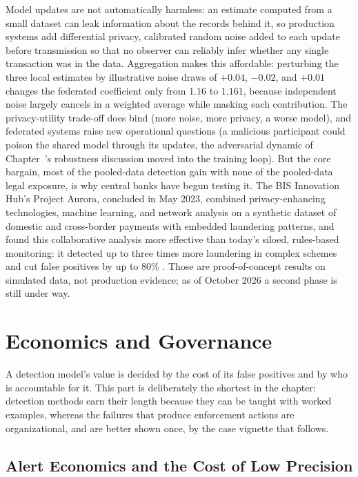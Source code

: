 \documentclass[../ai_in_finance]{subfiles}
\begin{document}
Model updates are not automatically harmless: an estimate computed from a small dataset can leak information about the records behind it, so production systems add differential privacy, calibrated random noise added to each update before transmission so that no observer can reliably infer whether any single transaction was in the data. Aggregation makes this affordable: perturbing the three local estimates by illustrative noise draws of $+0.04$, $-0.02$, and $+0.01$ changes the federated coefficient only from $1.16$ to $1.161$, because independent noise largely cancels in a weighted average while masking each contribution. The privacy-utility trade-off does bind (more noise, more privacy, a worse model), and federated systems raise new operational questions (a malicious participant could poison the shared model through its updates, the adversarial dynamic of Chapter~'s robustness discussion moved into the training loop). But the core bargain, most of the pooled-data detection gain with none of the pooled-data legal exposure, is why central banks have begun testing it. The BIS Innovation Hub's Project Aurora, concluded in May 2023, combined privacy-enhancing technologies, machine learning, and network analysis on a synthetic dataset of domestic and cross-border payments with embedded laundering patterns, and found this collaborative analysis more effective than today's siloed, rules-based monitoring: it detected up to three times more laundering in complex schemes and cut false positives by up to 80\% \parencite{bis2023aurora}. Those are proof-of-concept results on simulated data, not production evidence; as of October 2026 a second phase is still under way.

\section{Economics and Governance}

A detection model's value is decided by the cost of its false positives and by who is accountable for it. This part is deliberately the shortest in the chapter: detection methods earn their length because they can be taught with worked examples, whereas the failures that produce enforcement actions are organizational, and are better shown once, by the case vignette that follows.

\subsection{Alert Economics and the Cost of Low Precision}
\label{sec:alert-economics}
\end{document}
